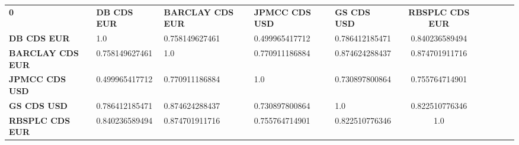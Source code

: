 \begin{center}
 \begin{tabular}{|l|l|l|l|l|c|c|c|c|c|}
\hline
\textbf{0} & \textbf{DB CDS EUR} & \textbf{BARCLAY CDS EUR} & \textbf{JPMCC CDS USD} & \textbf{GS CDS USD} & \textbf{RBSPLC CDS EUR}\\\hhline{|=|=|=|=|=|=|}
\textbf{DB CDS EUR} & 1.0 & 0.758149627461 & 0.499965417712 & 0.786412185471 & 0.840236589494\\
\textbf{BARCLAY CDS EUR} & 0.758149627461 & 1.0 & 0.770911186884 & 0.874624288437 & 0.874701911716\\
\textbf{JPMCC CDS USD} & 0.499965417712 & 0.770911186884 & 1.0 & 0.730897800864 & 0.755764714901\\
\textbf{GS CDS USD} & 0.786412185471 & 0.874624288437 & 0.730897800864 & 1.0 & 0.822510776346\\
\textbf{RBSPLC CDS EUR} & 0.840236589494 & 0.874701911716 & 0.755764714901 & 0.822510776346 & 1.0\\
\hline
\end{tabular}
\end{center}